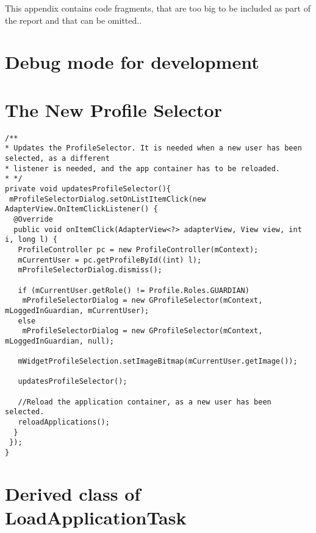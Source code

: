 This appendix contains code fragments, that are too big to be included as part of the report and that can be omitted..

\section {Debug mode for development}\label{appendix:debugmode}


\section{The New Profile Selector}

\begin{lstlisting}[caption={The method instantiating the Profile Selector with the correct arguments each time a new user is selected, inside the OnListItemClick listener.}, label={lst:newprofileselectoronitemclick}]
/**
* Updates the ProfileSelector. It is needed when a new user has been selected, as a different
* listener is needed, and the app container has to be reloaded.
* */
private void updatesProfileSelector(){
 mProfileSelectorDialog.setOnListItemClick(new AdapterView.OnItemClickListener() {
  @Override
  public void onItemClick(AdapterView<?> adapterView, View view, int i, long l) {
   ProfileController pc = new ProfileController(mContext);
   mCurrentUser = pc.getProfileById((int) l);
   mProfileSelectorDialog.dismiss();
  
   if (mCurrentUser.getRole() != Profile.Roles.GUARDIAN)
    mProfileSelectorDialog = new GProfileSelector(mContext, mLoggedInGuardian, mCurrentUser);
   else
    mProfileSelectorDialog = new GProfileSelector(mContext, mLoggedInGuardian, null);
  
   mWidgetProfileSelection.setImageBitmap(mCurrentUser.getImage());
  
   updatesProfileSelector();
  
   //Reload the application container, as a new user has been selected.
   reloadApplications();
  }
 });
} 
\end{lstlisting}

\section{Derived class of LoadApplicationTask}

